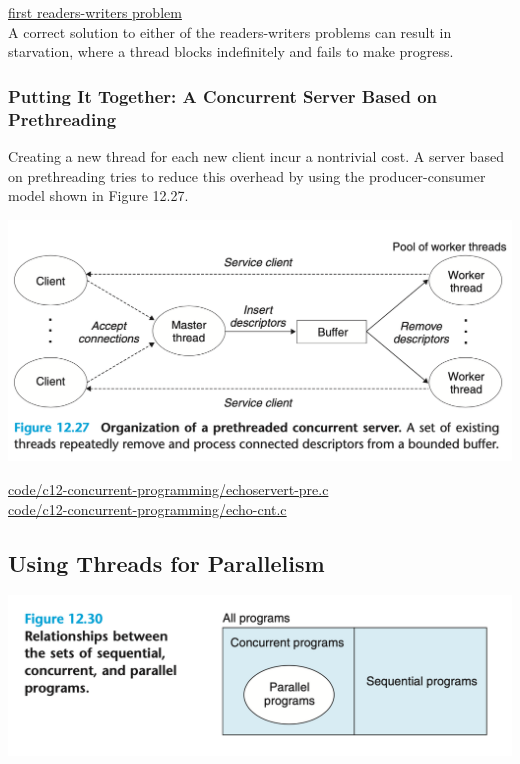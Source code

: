 \documentclass[11pt]{article}
\begin{document}
\begin{enumerate}
\href{code/c12-concurrent-programming/first-readers-writers.c}{first readers-writers problem}\\

A correct solution to either of the readers-writers problems can result in starvation, where a thread blocks indefinitely and fails to make progress.\\
\end{enumerate}



\subsubsection{Putting It Together: A Concurrent Server Based on Prethreading}
\label{sec:orgc77001e}

Creating a new thread for each new client incur a nontrivial cost. A server based on prethreading tries to reduce this overhead by using the producer-consumer model shown in Figure 12.27.\\

\begin{center}
\includegraphics[width=.9\linewidth]{pics/figure12.27-organization-of-a-prethreaded-concurrent-server.png}
\end{center}


\url{code/c12-concurrent-programming/echoservert-pre.c}\\

\url{code/c12-concurrent-programming/echo-cnt.c}\\


\subsection{Using Threads for Parallelism}
\label{sec:org3a505d6}

\begin{center}
\includegraphics[width=.9\linewidth]{pics/figure12.30-relationships-between-the-sets-of-sequential-concurrent-and-parallel-programs.png}
\end{center}
\end{document}
